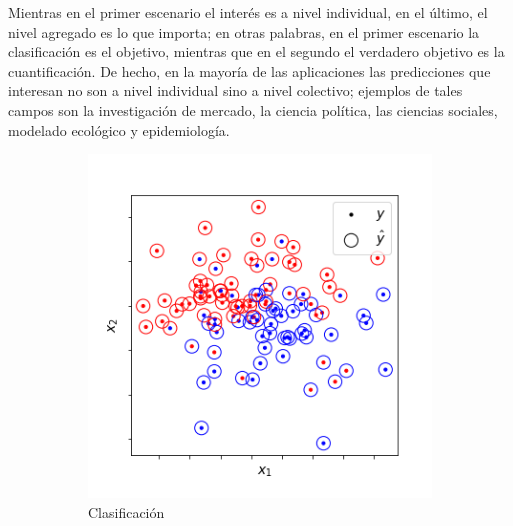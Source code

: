 Mientras en el primer escenario el interés es a nivel individual, en el último,
el nivel agregado es lo que importa; en otras palabras, en el primer escenario
la clasificación es el objetivo, mientras que en el segundo el verdadero
objetivo es la cuantificación. De hecho, en la mayoría de las aplicaciones las
predicciones que interesan no son a nivel individual sino a nivel colectivo;
ejemplos de tales campos son la investigación de mercado, la ciencia política,
las ciencias sociales, modelado ecológico y epidemiología.

\begin{figure}[h]
    \centering
    \begin{subfigure}[t]{0.4\textwidth}
        \includegraphics[width=\textwidth]{../plots_teoria/intro_scatterplot.png}
        \caption{Clasificación}
    \end{subfigure}
    \hfill
    \begin{subfigure}[t]{0.4\textwidth}

\end{subfigure}
\end{figure}
